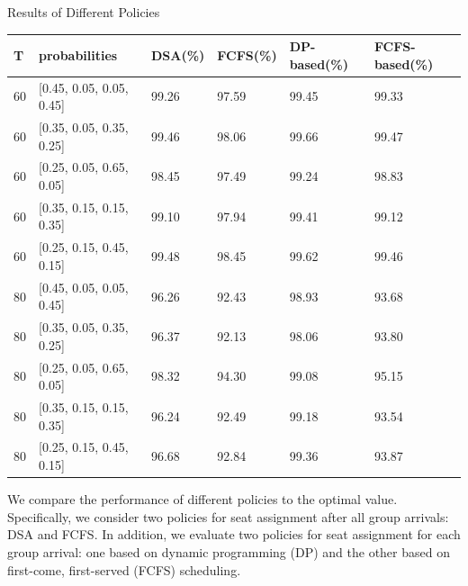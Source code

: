     \begin{frame}{Results of Different Policies}
        \scriptsize
        \begin{table}[ht]
            \centering
            \begin{tabular}{|l|l|l|l|l|l|}
            \hline
             T & probabilities &  DSA(\%) & FCFS(\%) & DP-based(\%) & FCFS-based(\%) \\
            \hline
             60  & [0.45, 0.05, 0.05, 0.45]  & 99.26 & 97.59 & 99.45 & 99.33 \\
             60  & [0.35, 0.05, 0.35, 0.25]  & 99.46 & 98.06 & 99.66 & 99.47 \\
             60  & [0.25, 0.05, 0.65, 0.05]  & 98.45 & 97.49 & 99.24 & 98.83 \\ %
             60  & [0.35, 0.15, 0.15, 0.35]  & 99.10 & 97.94 & 99.41 & 99.12 \\
             60  & [0.25, 0.15, 0.45, 0.15]  & 99.48 & 98.45 & 99.62 & 99.46 \\
             80  & [0.45, 0.05, 0.05, 0.45]  & 96.26 & 92.43 & 98.93 & 93.68 \\
             80  & [0.35, 0.05, 0.35, 0.25]  & 96.37 & 92.13 & 98.06 & 93.80 \\
             80  & [0.25, 0.05, 0.65, 0.05]  & 98.32 & 94.30 & 99.08 & 95.15 \\
             80  & [0.35, 0.15, 0.15, 0.35]  & 96.24 & 92.49 & 99.18 & 93.54 \\
             80  & [0.25, 0.15, 0.45, 0.15]  & 96.68 & 92.84 & 99.36 & 93.87 \\
            \hline
            \end{tabular}
          \end{table}

          We compare the performance of different policies to the optimal value. Specifically, we consider two policies for seat assignment after all group arrivals: DSA and FCFS. In addition, we evaluate two policies for seat assignment for each group arrival: one based on dynamic programming (DP) and the other based on first-come, first-served (FCFS) scheduling.
    \end{frame}
      
